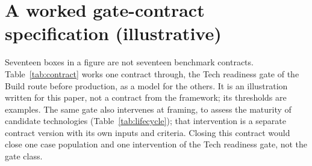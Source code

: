 \section{A worked gate-contract specification (illustrative)}
\label{app:contract}

Seventeen boxes in a figure are not seventeen benchmark contracts. Table~\ref{tab:contract} works one
contract through, the Tech readiness gate of the Build route before production, as a model for the
others. It is an illustration written for this paper, not a contract from the framework; its thresholds
are examples. The same gate also intervenes at framing, to assess the maturity of candidate
technologies (Table~\ref{tab:lifecycle}); that intervention is a separate contract version with its own
inputs and criteria. Closing this contract would close one case population and one intervention of the
Tech readiness gate, not the gate class.


